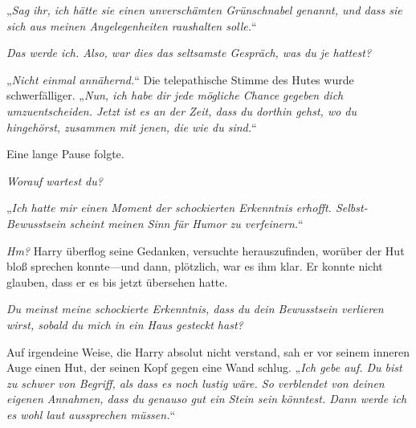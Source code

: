 „\emph{Sag ihr, ich hätte sie einen unverschämten Grünschnabel genannt, und dass sie sich aus meinen Angelegenheiten raushalten solle.}“

\emph{Das werde ich. Also, war dies das seltsamste Gespräch, was du je hattest? }

„\emph{Nicht einmal annähernd.}“ Die telepathische Stimme des Hutes wurde schwerfälliger. „\emph{Nun, ich habe dir jede mögliche Chance gegeben dich umzuentscheiden. Jetzt ist es an der Zeit, dass du dorthin gehst, wo du hingehörst, zusammen mit jenen, die wie du sind.}“

Eine lange Pause folgte.

\emph{Worauf wartest du? }

„\emph{Ich hatte mir einen Moment der schockierten Erkenntnis erhofft. Selbst-Bewusstsein scheint meinen Sinn für Humor zu verfeinern.}“

\emph{Hm?} Harry überflog seine Gedanken, versuchte herauszufinden, worüber der Hut bloß sprechen konnte—und dann, plötzlich, war es ihm klar. Er konnte nicht glauben, dass er es bis jetzt übersehen hatte.

\emph{Du meinst meine schockierte Erkenntnis, dass du dein Bewusstsein verlieren wirst, sobald du mich in ein Haus gesteckt hast?}

Auf irgendeine Weise, die Harry absolut nicht verstand, sah er vor seinem inneren Auge einen Hut, der seinen Kopf gegen eine Wand schlug. „\emph{Ich gebe auf. Du bist zu schwer von Begriff, als dass es noch lustig wäre. So verblendet von deinen eigenen Annahmen, dass du genauso gut ein Stein sein könntest. Dann werde ich es wohl laut aussprechen müssen.}“

